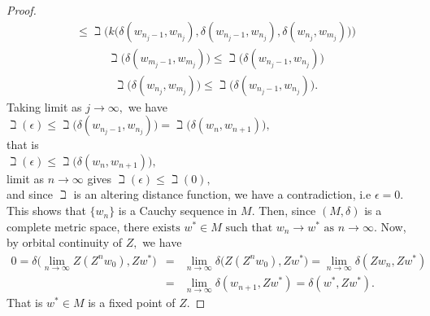 \documentclass[10pt,a4paper]{amsart}
\begin{document}
\begin{proof}
\begin{eqnarray*}
			&\leq \beth\Big(k\Big(\delta(w_{n_j-1},w_{n_j}), \delta(w_{n_j-1},w_{n_j}), \delta(w_{n_j},w_{m_j})\Big)\Big)
		\end{eqnarray*}
		\begin{eqnarray*}
			&\beth \Big(\delta(w_{m_j-1},w_{m_j})\Big) \leq \beth\Big(\delta(w_{n_j-1},w_{n_j})\Big)
		\end{eqnarray*}
		\begin{eqnarray*}
			&\beth \Big(\delta(w_{n_j},w_{m_j})\Big) \leq \beth\Big(\delta(w_{n_j-1},w_{n_j})\Big).
		\end{eqnarray*}
		Taking limit as $j \rightarrow \infty,$ we have \\		
		$\beth (\epsilon) \leq \beth\Big(\delta(w_{n_j-1},w_{n_j})\Big) = \beth\Big(\delta(w_{n},w_{n+1})\Big),$\\
		that is\\
		$\beth (\epsilon) \leq \beth\Big(\delta(w_{n},w_{n+1})\Big),$\\
		limit as $n \to \infty$ gives
		$\beth (\epsilon) \leq \beth(0),$\\
		and since $\beth$ is an altering distance function, we have a contradiction, i.e $\epsilon =0.$\\
		This shows that $\{w_{n}\}$ is a Cauchy sequence in $M$. Then, since $(M, \delta)$ is a complete metric space, $\text{there exists }%
		w^* \in M \text{ such that }w_{n}\rightarrow w^{\ast }\text{ as }%
		n\rightarrow \infty $.\newline
		Now, by orbital continuity of $Z,$ we have\\
		\begin{eqnarray*}
		0=\delta\Big(\lim_{n \to \infty}Z(Z^nw_0),Zw^*\Big)&=&\lim_{n \to \infty} \delta\Big(Z(Z^nw_0),Zw^*\Big)= \lim_{n \to \infty} \delta(Zw_n,Zw^*)\\
		&=& \lim_{n \to \infty} \delta(w_{n+1},Zw^*)= \delta(w^*,Zw^*).
		\end{eqnarray*}
		That is $w^* \in M$ is a fixed point of $Z.$		
		\end{proof}
\end{document}
